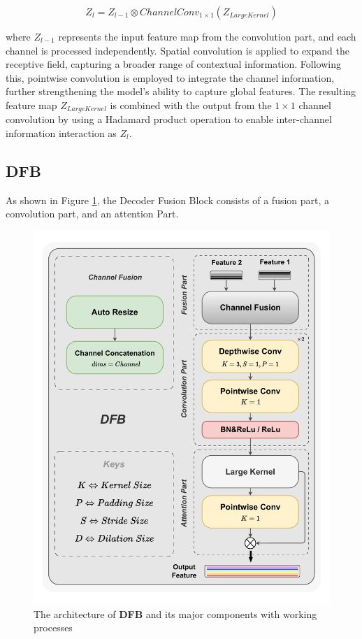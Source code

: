 \documentclass[sn-mathphys-num]{sn-jnl}
\theoremstyle{thmstyleone}%
\theoremstyle{thmstyletwo}%
\theoremstyle{thmstylethree}%
\begin{document}
\begin{equation}
    Z_{l} = Z_{l-1} \otimes ChannelConv_{1\times 1}\left(Z_{LargeKernel}\right)
\end{equation}

where \(Z_{l-1}\) represents the input feature map from the convolution part, and each channel is processed independently.
Spatial convolution is applied to expand the receptive field, capturing a broader range of contextual information.
Following this, pointwise convolution is employed to integrate the channel information, further strengthening the model's ability to capture global features.
The resulting feature map \(Z_{LargeKernel}\) is combined with the output from the \(1\times 1\) channel convolution by using a Hadamard product operation to enable inter-channel information interaction as \(Z_l\).


\subsection{DFB}\label{subsec3}

As shown in Figure \ref{fig3}, the Decoder Fusion Block consists of a fusion part, a convolution part, and an attention Part.

\begin{figure}[ht]
    \centering
    \includegraphics[height=0.6\textheight]{figure3.pdf}
    \caption{The architecture of \textbf{DFB} and its major components with working processes}\label{fig3}
\end{figure}
\end{document}
